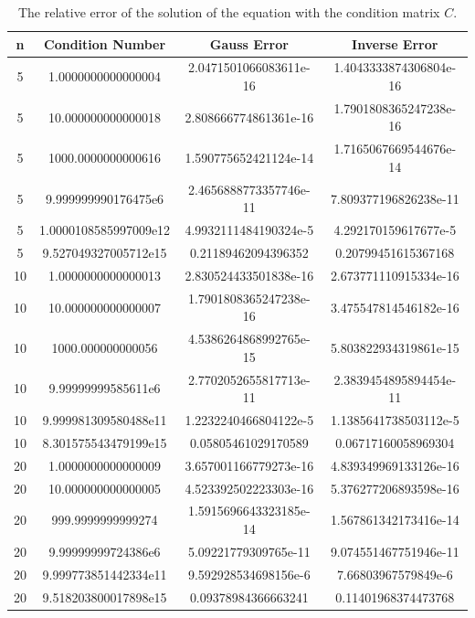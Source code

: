 \documentclass[a4paper, 12pt]{article}
\begin{document}
\begin{table}[H]
\centering
\begin{tabular}{@{}cccc@{}}
\toprule
n  & Condition Number      & Gauss Error            & Inverse Error          \\ \midrule
5  & 1.0000000000000004    & 2.0471501066083611e-16 & 1.4043333874306804e-16 \\ \midrule
5  & 10.000000000000018    & 2.808666774861361e-16  & 1.7901808365247238e-16 \\ \midrule
5  & 1000.0000000000616    & 1.590775652421124e-14  & 1.7165067669544676e-14 \\ \midrule
5  & 9.999999990176475e6   & 2.4656888773357746e-11 & 7.809377196826238e-11  \\ \midrule
5  & 1.0000108585997009e12 & 4.9932111484190324e-5  & 4.292170159617677e-5   \\ \midrule
5  & 9.527049327005712e15  & 0.21189462094396352    & 0.20799451615367168    \\ \midrule
10 & 1.0000000000000013    & 2.830524433501838e-16  & 2.673771110915334e-16  \\ \midrule
10 & 10.000000000000007    & 1.7901808365247238e-16 & 3.475547814546182e-16  \\ \midrule
10 & 1000.000000000056     & 4.5386264868992765e-15 & 5.803822934319861e-15  \\ \midrule
10 & 9.99999999585611e6    & 2.7702052655817713e-11 & 2.3839454895894454e-11 \\ \midrule
10 & 9.999981309580488e11  & 1.2232240466804122e-5  & 1.1385641738503112e-5  \\ \midrule
10 & 8.301575543479199e15  & 0.05805461029170589    & 0.06717160058969304    \\ \midrule
20 & 1.0000000000000009    & 3.657001166779273e-16  & 4.839349969133126e-16  \\ \midrule
20 & 10.000000000000005    & 4.523392502223303e-16  & 5.376277206893598e-16  \\ \midrule
20 & 999.9999999999274     & 1.5915696643323185e-14 & 1.567861342173416e-14  \\ \midrule
20 & 9.99999999724386e6    & 5.09221779309765e-11   & 9.074551467751946e-11  \\ \midrule
20 & 9.999773851442334e11  & 9.592928534698156e-6   & 7.66803967579849e-6    \\ \midrule
20 & 9.518203800017898e15  & 0.09378984366663241    & 0.11401968374473768    \\ \bottomrule
\end{tabular}
\caption{The relative error of the solution of the equation with the condition matrix $C$.}
\label{tab:error_condition}
\end{table}
\end{document}

